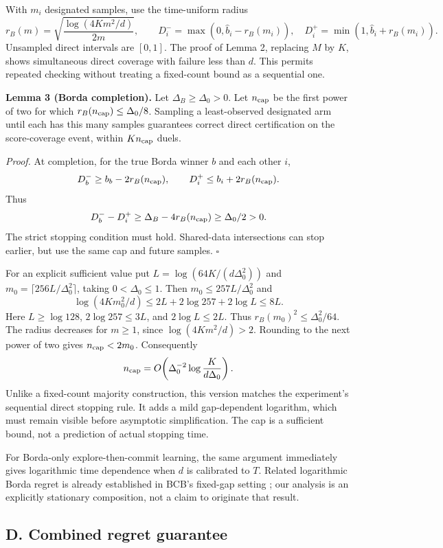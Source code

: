 \documentclass[11pt,a4paper]{article}
\begin{document}
With $m_i$ designated samples, use the time-uniform radius
\[
r_B(m)=\sqrt{\frac{\log(4Km^2/d)}{2m}},\qquad
D_i^- =\max(0,\widehat b_i-r_B(m_i)),\quad
D_i^+ =\min(1,\widehat b_i+r_B(m_i)).
\]
Unsampled direct intervals are $[0,1]$. The proof of Lemma 2, replacing $M$ by $K$, shows simultaneous direct coverage with failure less than $d$. This permits repeated checking without treating a fixed-count bound as a sequential one.

\textbf{Lemma 3 (Borda completion).} Let $\Delta_B\ge\Delta_0>0$. Let $n_{\rm cap}$ be the first power of two for which $r_B(n_{\rm cap})\le\Delta_0/8$. Sampling a least-observed designated arm until each has this many samples guarantees correct direct certification on the score-coverage event, within $Kn_{\rm cap}$ duels.

\emph{Proof.} At completion, for the true Borda winner $b$ and each other $i$,
\[
D_b^-\ge b_b-2r_B(n_{\rm cap}),\qquad
D_i^+\le b_i+2r_B(n_{\rm cap}).
\]
Thus
\[
D_b^- -D_i^+\ge \Delta_B-4r_B(n_{\rm cap})
\ge\Delta_0/2>0.
\]
The strict stopping condition must hold. Shared-data intersections can stop earlier, but use the same cap and future samples. \hfill$\square$

For an explicit sufficient value put $L=\log(64K/(d\Delta_0^2))$ and $m_0=\lceil256L/\Delta_0^2\rceil$, taking $0<\Delta_0\le1$. Then $m_0\le257L/\Delta_0^2$ and
\[
\log(4Km_0^2/d)\le2L+2\log257+2\log L\le8L.
\]
Here $L\ge\log128$, $2\log257\le3L$, and $2\log L\le2L$. Thus $r_B(m_0)^2\le\Delta_0^2/64$. The radius decreases for $m\ge1$, since $\log(4Km^2/d)>2$. Rounding to the next power of two gives $n_{\rm cap}<2m_0$. Consequently
\[
n_{\rm cap}=O\!\left(\Delta_0^{-2}\log\frac{K}{d\Delta_0}\right).
\]
Unlike a fixed-count majority construction, this version matches the experiment's sequential direct stopping rule. It adds a mild gap-dependent logarithm, which must remain visible before asymptotic simplification. The cap is a sufficient bound, not a prediction of actual stopping time.

For Borda-only explore-then-commit learning, the same argument immediately gives logarithmic time dependence when $d$ is calibrated to $T$. Related logarithmic Borda regret is already established in BCB's fixed-gap setting \cite{bcb}; our analysis is an explicitly stationary composition, not a claim to originate that result.

\subsection{D. Combined regret guarantee}
\end{document}
